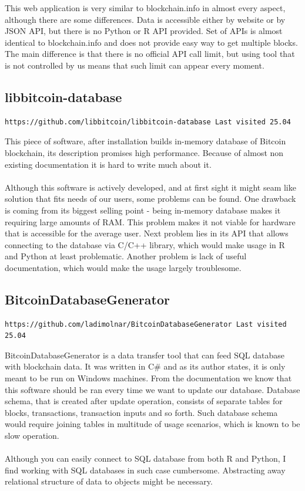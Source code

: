 \documentclass[12pt, en, eng, oneside]{mgr}
\begin{document}
This web application is very similar to blockchain.info in almost every aspect, although there are some differences. Data is accessible either by website or by JSON API, but there is no Python or R API provided. Set of APIs is almost identical to blockchain.info and does not provide easy way to get multiple blocks. The main difference is that there is no official API call limit, but using tool that is not controlled by us means that such limit can appear every moment.

\subsection*{libbitcoin-database}

\begin{verbatim}
https://github.com/libbitcoin/libbitcoin-database Last visited 25.04
\end{verbatim}

This piece of software, after installation builds in-memory database of Bitcoin blockchain, its description promises high performance. Because of almost non existing documentation it is hard to write much about it.
\\
\\
Although this software is actively developed, and at first sight it might seam like solution that fits needs of our users, some problems can be found. One drawback is coming from its biggest selling point - being in-memory database makes it requiring large amounts of RAM. This problem makes it not viable for hardware that is accessible for the average user. Next problem lies in its API that allows connecting to the database via C/C++ library, which would make usage in R and Python at least problematic. Another problem is lack of useful documentation, which would make the usage largely troublesome.

\subsection*{BitcoinDatabaseGenerator}

\begin{verbatim}
https://github.com/ladimolnar/BitcoinDatabaseGenerator Last visited 25.04
\end{verbatim}

BitcoinDatabaseGenerator is a data transfer tool that can feed SQL database with blockchain data. It was written in C\# and as its author states, it is only meant to be run on Windows machines. From the documentation we know that this software should be ran every time we want to update our database. Database schema, that is created after update operation, consists of separate tables for blocks, transactions, transaction inputs and so forth. Such database schema would require joining tables in multitude of usage scenarios, which is known to be slow operation.
\\
\\
Although you can easily connect to SQL database from both R and Python, I find working with SQL databases in such case cumbersome. Abstracting away relational structure of data to objects might be necessary. 
\end{document}
